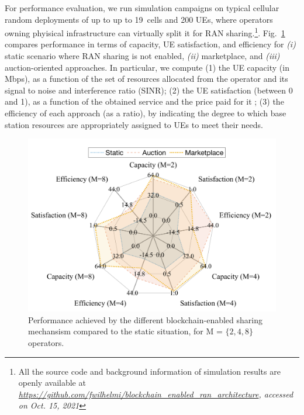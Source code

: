 \documentclass[journal]{IEEEtran}
\begin{document}
	For performance evaluation, we run simulation campaigns on typical cellular random deployments of up to  up to 19~cells and 200 UEs, where operators owning phyisical infrastructure can virtually split it for RAN sharing.\footnote{All the source code and background information of simulation results are openly available at \textit{\url{https://github.com/fwilhelmi/blockchain_enabled_ran_architecture}, accessed on Oct. 15, 2021}}. Fig.~\ref{fig:performance} compares performance in terms of capacity, UE satisfaction, and efficiency for \textit{(i)} static scenario where RAN sharing is not enabled, \textit{(ii)} marketplace, and \textit{(iii)} auction-oriented approaches. In particular, we compute (1) the UE capacity (in Mbps), as a function of the set of resources allocated from the operator and its signal to noise and interference ratio (SINR); (2) the UE satisfaction (between 0 and 1), as a function of the obtained service and the price paid for it%
	; (3) the efficiency of each approach (as a ratio), by indicating the degree to which base station resources are appropriately assigned to UEs to meet their needs.
	
	\begin{figure}[ht!]
		\centering
		\includegraphics[width=.9\linewidth]{spiderplot.png}
		\caption{Performance achieved by the different blockchain-enabled sharing mechansism compared to the static situation, for M = $\{2, 4, 8\}$ operators.}
		\label{fig:performance}
	\end{figure}
	
\end{document}
